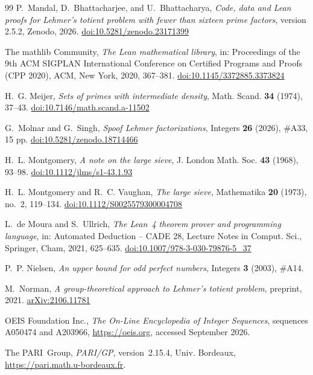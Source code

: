 \documentclass[screen,reqno]{aomart}
\numberwithin{equation}{section}
\theoremstyle{plain}
\theoremstyle{definition}
\theoremstyle{remark}
\begin{document}
\begin{thebibliography}{99}
P.~Mandal, D.~Bhattacharjee, and U.~Bhattacharya,
\emph{Code, data and Lean proofs for Lehmer's totient problem with
fewer than sixteen prime factors}, version 2.5.2, Zenodo, 2026.
\href{https://doi.org/10.5281/zenodo.23171399}{doi:10.5281/zenodo.23171399}

The mathlib Community,
\emph{The Lean mathematical library},
in: Proceedings of the 9th ACM SIGPLAN International Conference on
Certified Programs and Proofs (CPP 2020), ACM, New York, 2020, 367--381.
\href{https://doi.org/10.1145/3372885.3373824}{doi:10.1145/3372885.3373824}

H.~G. Meijer,
\emph{Sets of primes with intermediate density},
Math. Scand. \textbf{34} (1974), 37--43.
\href{https://doi.org/10.7146/math.scand.a-11502}{doi:10.7146/math.scand.a-11502}

G.~Molnar and G.~Singh,
\emph{Spoof Lehmer factorizations},
Integers \textbf{26} (2026), \#A33, 15 pp.
\href{https://doi.org/10.5281/zenodo.18714466}{doi:10.5281/zenodo.18714466}

H.~L. Montgomery,
\emph{A note on the large sieve},
J. London Math. Soc. \textbf{43} (1968), 93--98.
\href{https://doi.org/10.1112/jlms/s1-43.1.93}{doi:10.1112/jlms/s1-43.1.93}

H.~L. Montgomery and R.~C. Vaughan,
\emph{The large sieve},
Mathematika \textbf{20} (1973), no.~2, 119--134.
\href{https://doi.org/10.1112/S0025579300004708}{doi:10.1112/S0025579300004708}

L.~de Moura and S.~Ullrich,
\emph{The Lean~4 theorem prover and programming language},
in: Automated Deduction -- CADE 28, Lecture Notes in Comput. Sci.,
Springer, Cham, 2021, 625--635.
\href{https://doi.org/10.1007/978-3-030-79876-5_37}{doi:10.1007/978-3-030-79876-5\_37}

P.~P. Nielsen,
\emph{An upper bound for odd perfect numbers},
Integers \textbf{3} (2003), \#A14.

M.~Norman,
\emph{A group-theoretical approach to Lehmer's totient problem},
preprint, 2021.
\href{https://arxiv.org/abs/2106.11781}{arXiv:2106.11781}

OEIS Foundation Inc.,
\emph{The On-Line Encyclopedia of Integer Sequences},
sequences A050474 and A203966, \url{https://oeis.org}, accessed
September 2026.

The PARI~Group,
\emph{PARI/GP}, version~2.15.4, Univ. Bordeaux,
\url{https://pari.math.u-bordeaux.fr}.


\end{thebibliography}
\end{document}
